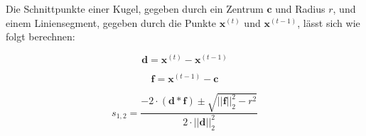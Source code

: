 Die Schnittpunkte einer Kugel, gegeben durch ein Zentrum $\textbf{c}$ und Radius $r$, und einem Liniensegment, gegeben durch die Punkte $\textbf{x}^{(t)}$ und $\textbf{x}^{(t-1)}$, lässt sich wie folgt berechnen:

\hspace{-1cm}\begin{minipage}{.333333\linewidth}
	\begin{equation*}
	\textbf{d} = \textbf{x}^{(t)} - \textbf{x}^{(t-1)}
	\end{equation*}
\end{minipage}%
\begin{minipage}{.333333\linewidth}
	\begin{equation*}
	\textbf{f} = \textbf{x}^{(t-1)} - \textbf{c}
	\end{equation*}
\end{minipage}
\begin{minipage}{.333333\linewidth}
	\begin{equation*}
	s_{1,2} = \frac{-2 \cdot (\textbf{d} * \textbf{f}) \pm \sqrt{||\textbf{f}||_2^2 - r^2}}{2 \cdot ||\textbf{d}||_2^2}
	\end{equation*}
\end{minipage}



